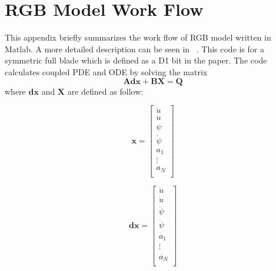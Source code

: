 \chapter{RGB Model Work Flow}
\label{ap:rgbworkflow}
This appendix briefly summarizes the work flow of RGB model written in Matlab. A more detailed description can be seen in ~\cite{ref:zhang2020a}. This code is for a symmetric full blade which is defined as a D1 bit in the paper. The code calculates coupled PDE and ODE by solving the matrix
\begin{equation}\label{matrix}
  \bm{Adx} + \bm{BX} = \bm{Q}
\end{equation}
where $\bm{dx}$ and $\bm{X}$ are defined as follow:

\vspace{\abovedisplayskip}
\noindent\begin{minipage}{.4\linewidth}
	\begin{equation}
		\bm{x}=
		\begin{bmatrix}
		\dot{u} \\
		u \\
		\psi \\
		\dot{\psi} \\
		a_1\ \\
		\vdots \\
		a_N \\
		\end{bmatrix}
	\end{equation}
\end{minipage}%
\hfill
\begin{minipage}{.4\linewidth}
	\begin{equation}
		\bm{dx}=
		\begin{bmatrix}
		\ddot{u} \\
		\dot{u} \\
		\dot{\psi} \\
		\ddot{\psi} \\
		\dot{a_1}\ \\
		\vdots \\
		\dot{a_N} \\
		\end{bmatrix}
	\end{equation}
\end{minipage}
\vspace{\belowdisplayskip}

